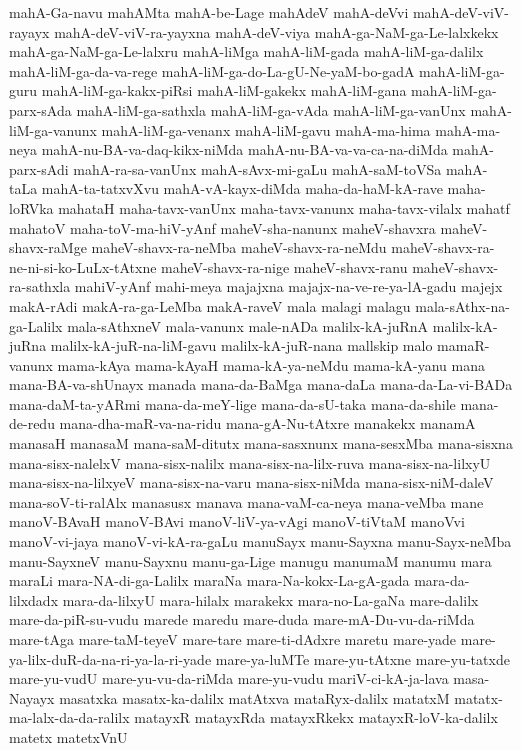 {mahA-Ga-navu
mahAMta
mahA-be-Lage
mahAdeV
mahA-deVvi
mahA-deV-viV-rayayx
mahA-deV-viV-ra-yayxna
mahA-deV-viya
mahA-ga-NaM-ga-Le-lalxkekx
mahA-ga-NaM-ga-Le-lalxru
mahA-liMga
mahA-liM-gada
mahA-liM-ga-dalilx
mahA-liM-ga-da-va-rege
mahA-liM-ga-do-La-gU-Ne-yaM-bo-gadA
mahA-liM-ga-guru
mahA-liM-ga-kakx-piRsi
mahA-liM-gakekx
mahA-liM-gana
mahA-liM-ga-parx-sAda
mahA-liM-ga-sathxla
mahA-liM-ga-vAda
mahA-liM-ga-vanUnx
mahA-liM-ga-vanunx
mahA-liM-ga-venanx
mahA-liM-gavu
mahA-ma-hima
mahA-ma-neya
mahA-nu-BA-va-daq-kikx-niMda
mahA-nu-BA-va-va-ca-na-diMda
mahA-parx-sAdi
mahA-ra-sa-vanUnx
mahA-sAvx-mi-gaLu
mahA-saM-toVSa
mahA-taLa
mahA-ta-tatxvXvu
mahA-vA-kayx-diMda
maha-da-haM-kA-rave
maha-loRVka
mahataH
maha-tavx-vanUnx
maha-tavx-vanunx
maha-tavx-vilalx
mahatf
mahatoV
maha-toV-ma-hiV-yAnf
maheV-sha-nanunx
maheV-shavxra
maheV-shavx-raMge
maheV-shavx-ra-neMba
maheV-shavx-ra-neMdu
maheV-shavx-ra-ne-ni-si-ko-LuLx-tAtxne
maheV-shavx-ra-nige
maheV-shavx-ranu
maheV-shavx-ra-sathxla
mahiV-yAnf
mahi-meya
majajxna
majajx-na-ve-re-ya-lA-gadu
majejx
makA-rAdi
makA-ra-ga-LeMba
makA-raveV
mala
malagi
malagu
mala-sAthx-na-ga-Lalilx
mala-sAthxneV
mala-vanunx
male-nADa
malilx-kA-juRnA
malilx-kA-juRna
malilx-kA-juR-na-liM-gavu
malilx-kA-juR-nana
mallskip
malo
mamaR-vanunx
mama-kAya
mama-kAyaH
mama-kA-ya-neMdu
mama-kA-yanu
mana
mana-BA-va-shUnayx
manada
mana-da-BaMga
mana-daLa
mana-da-La-vi-BADa
mana-daM-ta-yARmi
mana-da-meY-lige
mana-da-sU-taka
mana-da-shile
mana-de-redu
mana-dha-maR-va-na-ridu
mana-gA-Nu-tAtxre
manakekx
manamA
manasaH
manasaM
mana-saM-ditutx
mana-sasxnunx
mana-sesxMba
mana-sisxna
mana-sisx-nalelxV
mana-sisx-nalilx
mana-sisx-na-lilx-ruva
mana-sisx-na-lilxyU
mana-sisx-na-lilxyeV
mana-sisx-na-varu
mana-sisx-niMda
mana-sisx-niM-daleV
mana-soV-ti-ralAlx
manasusx
manava
mana-vaM-ca-neya
mana-veMba
mane
manoV-BAvaH
manoV-BAvi
manoV-liV-ya-vAgi
manoV-tiVtaM
manoVvi
manoV-vi-jaya
manoV-vi-kA-ra-gaLu
manuSayx
manu-Sayxna
manu-Sayx-neMba
manu-SayxneV
manu-Sayxnu
manu-ga-Lige
manugu
manumaM
manumu
mara
maraLi
mara-NA-di-ga-Lalilx
maraNa
mara-Na-kokx-La-gA-gada
mara-da-lilxdadx
mara-da-lilxyU
mara-hilalx
marakekx
mara-no-La-gaNa
mare-dalilx
mare-da-piR-su-vudu
marede
maredu
mare-duda
mare-mA-Du-vu-da-riMda
mare-tAga
mare-taM-teyeV
mare-tare
mare-ti-dAdxre
maretu
mare-yade
mare-ya-lilx-duR-da-na-ri-ya-la-ri-yade
mare-ya-luMTe
mare-yu-tAtxne
mare-yu-tatxde
mare-yu-vudU
mare-yu-vu-da-riMda
mare-yu-vudu
mariV-ci-kA-ja-lava
masa-Nayayx
masatxka
masatx-ka-dalilx
matAtxva
mataRyx-dalilx
matatxM
matatx-ma-lalx-da-da-ralilx
matayxR
matayxRda
matayxRkekx
matayxR-loV-ka-dalilx
matetx
matetxVnU
}
